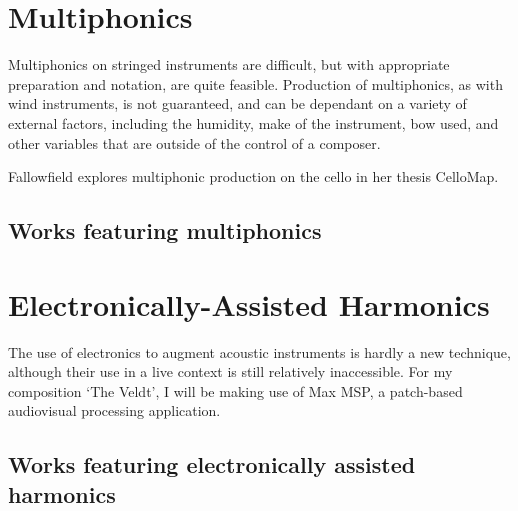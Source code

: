 \section{Multiphonics}
Multiphonics on stringed instruments are difficult, but with appropriate preparation and notation, are quite feasible. Production of multiphonics, as with wind instruments, is not guaranteed, and can be dependant on a variety of external factors, including the humidity, make of the instrument, bow used, and other variables that are outside of the control of a composer.

Fallowfield explores multiphonic production on the cello in her thesis CelloMap.\autocite{fallowfieldCelloMapHandbook2009} \lipsum[2]

\subsection{Works featuring multiphonics}
\lipsum[4]

\section{Electronically-Assisted Harmonics}
The use of electronics to augment acoustic instruments is hardly a new technique, although their use in a live context is still relatively inaccessible. For my composition `The Veldt', I will be making use of Max MSP, a patch-based audiovisual processing application. 

\subsection{Works featuring electronically assisted harmonics}
\lipsum[4]
